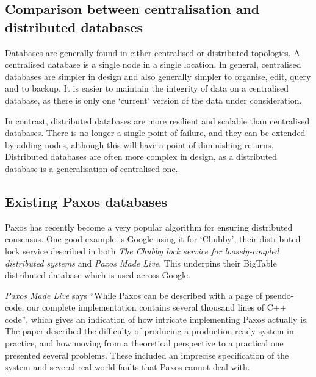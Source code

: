 \documentclass[12pt,twoside,notitlepage]{report}
\begin{document}
\subsection*{Comparison between centralisation and distributed databases}

Databases are generally found in either centralised or distributed topologies. A centralised
database is a single node in a single location. In general, centralised databases are simpler in
design and also generally simpler to organise, edit, query and to backup. It is
easier to maintain the integrity of data on a centralised database, as there is only one
`current' version of the data under consideration.

In contrast, distributed databases are more resilient and scalable than centralised databases.
There is no longer a single point of failure, and they can be extended by adding nodes, although
this will have a point of diminishing returns. Distributed databases are often more complex in
design, as a distributed database is a generalisation of centralised one.

\subsection*{Existing Paxos databases}

Paxos has recently become a very popular algorithm for ensuring distributed consensus. One good
example is Google using it for `Chubby', their distributed lock service described in both
\emph{The Chubby lock service for loosely-coupled distributed systems}\cite{burrows06} and
\emph{Paxos Made Live}\cite{chandra07}. This underpins their BigTable distributed database which
is used across Google.

\emph{Paxos Made Live}\cite{chandra07} says ``While Paxos can be described with a page of
pseudo-code, our complete implementation contains several thousand lines of C++ code'', which
gives an indication of how intricate implementing Paxos actually is.  The paper described the
difficulty of producing a production-ready system in practice, and how moving from a theoretical
perspective to a practical one presented several problems. These included an imprecise
specification of the system and several real world faults that Paxos cannot deal with.


\cleardoublepage
\end{document}
